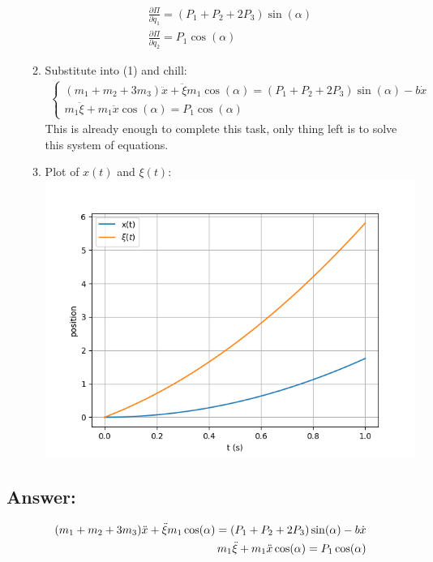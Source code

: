 \begin{enumerate}
\begin{enumerate}
\begin{align}
                        \frac{\partial \Pi}{\partial q_1} = (P_1 + P_2 + 2 P_3) \sin(\alpha)                                            \\
                        \frac{\partial \Pi}{\partial q_2} = P_1 \cos(\alpha)
                    \end{align}
              \item Substitute into (1) and chill:
                    \begin{align}
                        \begin{cases}
                            (m_1 + m_2 + 3 m_3) \ddot{x} + \ddot{\xi} m_1 \cos(\alpha) = (P_1 + P_2 + 2 P_3) \sin(\alpha) - b \dot{x} \\
                            m_1 \ddot{\xi} + m_1 \ddot{x} \cos(\alpha) = P_1 \cos(\alpha)
                        \end{cases}
                    \end{align}
                    This is already enough to complete this task, only thing left is to solve this system of equations.
              \item Plot of $x(t)$ and $\xi(t)$: \\
                    \includegraphics[width=\linewidth]{xxi.png}
          \end{enumerate}
\end{enumerate}

\subsection*{Answer:}

\begin{answer}
    \begin{align}
            (m_1 + m_2 + 3 m_3) \ddot{x} + \ddot{\xi} m_1 \cos(\alpha) = (P_1 + P_2 + 2 P_3) \sin(\alpha) - b \dot{x} \notag \\
            m_1 \ddot{\xi} + m_1 \ddot{x} \cos(\alpha) = P_1 \cos(\alpha) \notag
    \end{align}
\end{answer}